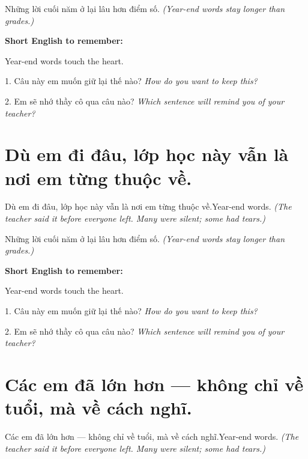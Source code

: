 \begin{baihoc}
Những lời cuối năm ở lại lâu hơn điểm số.
\textit{(Year-end words stay longer than grades.)}
\end{baihoc}

\begin{ghinhoanh}
\textbf{Short English to remember:}

Year-end words touch the heart.

\end{ghinhoanh}

\begin{tuhocnhanh}
1. Câu này em muốn giữ lại thế nào? \textit{How do you want to keep this?}

2. Em sẽ nhớ thầy cô qua câu nào? \textit{Which sentence will remind you of your teacher?}
\end{tuhocnhanh}
\ngancach


\section{Dù em đi đâu, lớp học này vẫn là nơi em từng thuộc về.}
\begin{truyen}{Dù em đi đâu, lớp học này vẫn là nơi em từng thuộc về.}{Year-end words.}
\textit{(The teacher said it before everyone left. Many were silent; some had tears.)}
\end{truyen}

\begin{baihoc}
Những lời cuối năm ở lại lâu hơn điểm số.
\textit{(Year-end words stay longer than grades.)}
\end{baihoc}

\begin{ghinhoanh}
\textbf{Short English to remember:}

Year-end words touch the heart.

\end{ghinhoanh}

\begin{tuhocnhanh}
1. Câu này em muốn giữ lại thế nào? \textit{How do you want to keep this?}

2. Em sẽ nhớ thầy cô qua câu nào? \textit{Which sentence will remind you of your teacher?}
\end{tuhocnhanh}
\ngancach


\section{Các em đã lớn hơn — không chỉ về tuổi, mà về cách nghĩ.}
\begin{truyen}{Các em đã lớn hơn — không chỉ về tuổi, mà về cách nghĩ.}{Year-end words.}
\textit{(The teacher said it before everyone left. Many were silent; some had tears.)}
\end{truyen}

